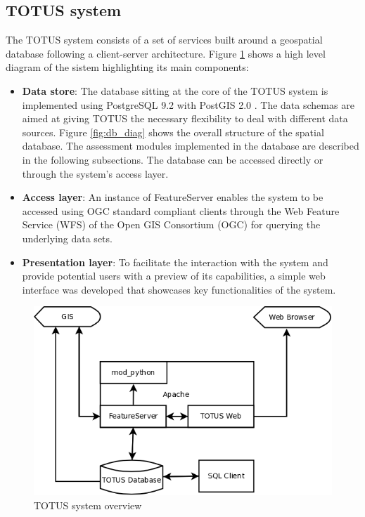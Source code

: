 
\subsection*{TOTUS system}
The TOTUS system consists of a set of services built around a geospatial database following a client-server architecture. Figure \ref{fig:system_diag} shows a high level diagram of the sistem highlighting its main components:
\begin{itemize}
	\item \textbf{Data store}: The database sitting at the core of the TOTUS system is implemented using PostgreSQL 9.2 \cite{pgsql} with PostGIS 2.0 \cite{postgis}. The data schemas are aimed at giving TOTUS the necessary flexibility to deal with different data sources. Figure \ref{fig:db_diag} shows the overall structure of the spatial database. The assessment modules implemented in the database are described in the following subsections. The database can be accessed directly or through the system's access layer.
	\item \textbf{Access layer}: An instance of FeatureServer\cite{dummy_temp} enables the system to be accessed using OGC standard compliant clients through the Web Feature Service (WFS) of the Open GIS
	Consortium (OGC) for querying the underlying data sets.
	\item \textbf{Presentation layer}: To facilitate the interaction with the system and provide potential users with a preview of its capabilities, a simple web interface was developed that showcases key functionalities of the system.
\end{itemize}
\begin{figure}
	\caption{TOTUS system overview}
	\label{fig:system_diag}
	\includegraphics[width = 12cm]{system.png}
\end{figure}

